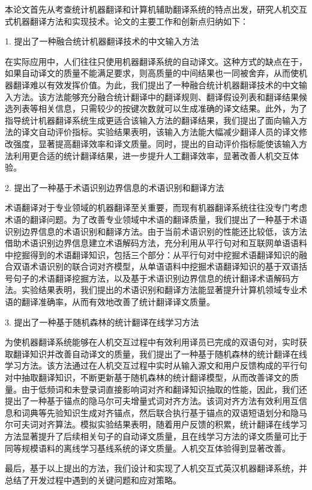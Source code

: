 本论文首先从考查统计机器翻译和计算机辅助翻译系统的特点出发，研究人机交互式机器翻译方法和实现技术。论文的主要工作和创新点归纳如下：

1. 提出了一种融合统计机器翻译技术的中文输入方法

在实际应用中，人们往往只使用机器翻译系统的自动译文。这种方式的缺点在于，如果自动译文的质量不能满足要求，则高质量的中间结果也一同被舍弃，从而使机器翻译难以有效发挥价值。为此，我们提出了一种融合统计机器翻译技术的中文输入方法。该方法能够充分融合统计翻译中的翻译规则、翻译假设列表和翻译结果候选列表等相关信息，只需较少的按键次数就可以生成准确的译文结果。此外，为了指导统计机器翻译系统生成更适合该输入方法的翻译结果，我们提出了面向输入方法的译文自动评价指标。实验结果表明，该输入方法能大幅减少翻译人员的译文修改强度，显著提高翻译效率和译文质量。同时，提出的自动评价指标能使该输入方法利用更合适的统计翻译结果，进一步提升人工翻译效率，显著改善人机交互体验。

2. 提出了一种基于术语识别边界信息的术语识别和翻译方法

术语翻译对于专业领域的机器翻译至关重要，而现有机器翻译系统往往没专门考虑术语的翻译问题。为了改善专业领域中术语的翻译质量，我们提出了一种基于术语识别边界信息的术语识别和翻译方法。由于当前术语识别的性能还比较低，该方法借助术语识别边界信息建立术语解码方法，充分利用从平行句对和互联网单语语料中挖掘得到的术语翻译知识，包括三个部分：从平行句对中挖掘术语翻译知识的融合双语术语识别的联合词对齐模型，从单语语料中挖掘术语翻译知识的基于双语括号句子的术语翻译挖掘方法，以及基于术语识别边界信息的统计翻译术语解码方法。实验结果表明，我们提出的术语识别和翻译方法能显著提升计算机领域专业术语的翻译准确率，从而有效地改善了统计翻译译文质量。

3. 提出了一种基于随机森林的统计翻译在线学习方法

为使机器翻译系统能够在人机交互过程中有效利用译员已完成的双语句对，实时获取翻译知识并改善自动译文的质量，我们提出了一种基于随机森林的统计翻译在线学习方法。该方法通过在人机交互过程中实时从输入源文和用户反馈构成的平行句对中抽取翻译知识，不断更新基于随机森林的统计翻译模型，从而改善译文的质量。由于低频词和未登录词直接影响词对齐和翻译知识抽取的性能，因此，我们还提出了一种基于锚点的隐马尔可夫增量式词对齐方法。该词对齐方法有效利用互信息和词典等先验知识生成对齐锚点，然后联合执行基于锚点的双语短语划分和隐马尔可夫词对齐算法。模拟实验结果表明，随着用户反馈的积累，统计翻译在线学习方法显著提升了后续相关句子的自动译文质量，且在线学习方法的译文质量可比于同等规模语料的离线学习基线系统的译文质量。人机交互体验得到显著改善。

最后，基于以上提出的方法，我们设计和实现了人机交互式英汉机器翻译系统，并总结了开发过程中遇到的关键问题和应对策略。

